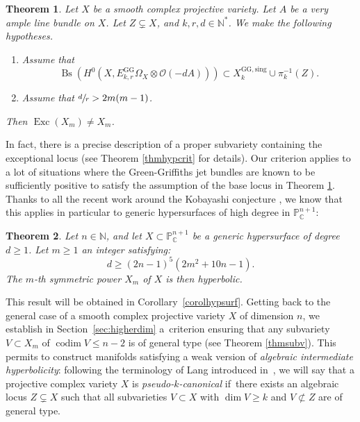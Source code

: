 \documentclass[JEP,XML,SOM,Unicode, NoEqCountersInSection,NoFloatCountersInSection,published]{cedram}
\let\mathcal\mathscr
\newcommand{\rGG}{\mathrm{GG}}
\newcommand{\sing}{\mathrm{sing}}
\DeclareMathOperator{\Bs}{Bs}
\DeclareMathOperator{\codim}{codim}
\DeclareMathOperator{\Exc}{Exc}
\theoremstyle{theorem}
\newtheorem{theorem}{Theorem}
\theoremstyle{definition}
\def\bP{{\mathbb P}}
\begin{document}
\begin{theorem}\label{criterion}
Let $X$ be a smooth complex projective variety. Let $A$ be a very ample line bundle on $X$. Let $Z \subsetneq X$, and $k, r ,d \in \mathbb N^\ast$. We make the following hypotheses.

\begin{enumerate}
\item Assume that\vspace*{-3pt}
\[
\Bs \left(H^0 (X, E_{k,r}^{\rGG} \Omega_X \otimes \mathcal O(- d A)) \right) \subset X_k^{\rGG, \sing} \cup \pi_k^{-1}(Z).
\]

\item Assume that $\sfrac{d}{r} > 2 m(m-1)$.
\end{enumerate}
Then $\Exc(X_m)\neq X_m$.
\end{theorem}

In fact, there is a precise description of a proper subvariety containing the exceptional locus (see Theorem \ref{thmhypcrit} for details). Our criterion applies to a lot of situations where the Green-Griffiths jet bundles are known to be sufficiently positive to satisfy the assumption of the base locus in Theorem \ref{criterion}. Thanks to all the recent work around the Kobayashi conjecture \cite{bro17, den17, dem18, RY18, BK19}, we know that this applies in particular to generic hypersurfaces of high degree in \(\bP_{\mathbb{C}}^{n+1}\):

\begin{theorem} \label{thm:genhyp}
Let \(n \in \mathbb{N}\), and let $X \subset \mathbb P_{\mathbb{C}}^{n+1}$ be a generic hypersurface of degree $d \geq 1$. Let $m\geq 1$ an integer satisfying:
\[
d \geq (2n - 1)^5 (2m^2 + 10 n - 1).
\]
The $m$-th symmetric power $X_m$ of $X$ is then hyperbolic.
\end{theorem}

This result will be obtained in Corollary~\ref{corolhypsurf}. Getting back to the general case of a smooth complex projective variety \(X\) of dimension \(n\), we establish in Section~\ref{sec:higherdim} a~criterion ensuring that any subvariety $V \subset X_m$ of $\codim  V \leq n - 2$ is of general type (see Theorem \ref{thmsubv}). This permits to construct manifolds satisfying a weak version of \emph{algebraic intermediate hyperbolicity}: following the terminology of Lang introduced in~\cite{Lang97}, we will say that a projective complex variety \(X\) is \emph{pseudo-\(k\)-canonical} if~there exists an algebraic locus \(Z \subsetneq X\) such that all subvarieties \(V \subset X\) with \(\dim V \geq k\) and \(V \not\subset Z\) are of general type.
\end{document}
